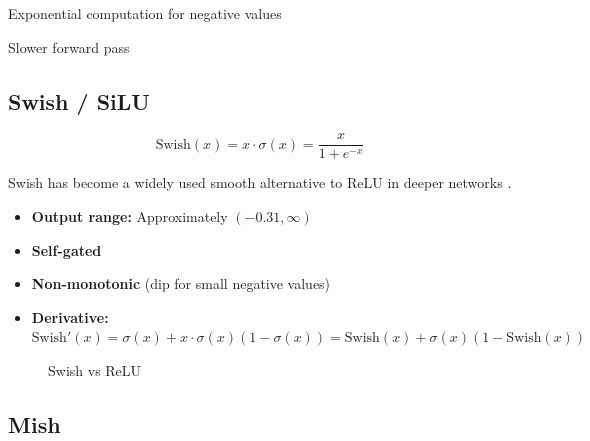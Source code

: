 \begin{disadvantages}
    \item Exponential computation for negative values
    \item Slower forward pass
\end{disadvantages}

\subsection{Swish / SiLU}

\begin{equation}
\text{Swish}(x) = x \cdot \sigma(x) = \frac{x}{1 + e^{-x}}
\end{equation}

Swish has become a widely used smooth alternative to ReLU in deeper networks \cite{ramachandran2017searching}.

\begin{properties}
\begin{itemize}
    \item \textbf{Output range:} Approximately $(-0.31, \infty)$
    \item \textbf{Self-gated}
    \item \textbf{Non-monotonic} (dip for small negative values)
    \item \textbf{Derivative:} $\text{Swish}'(x) = \sigma(x) + x \cdot \sigma(x)(1 - \sigma(x)) = \text{Swish}(x) + \sigma(x)(1 - \text{Swish}(x))$
\end{itemize}
\end{properties}

\begin{figure}[htbp]
    \centering
    \caption[Swish activation function]{Swish vs ReLU}
    \label{fig:swish}
\end{figure}

\subsection{Mish}

